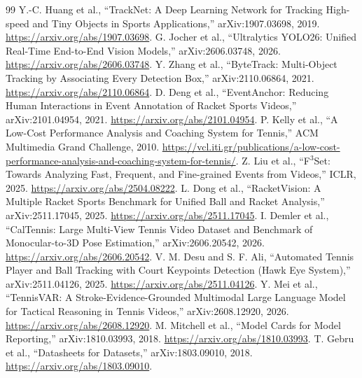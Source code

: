 \documentclass[10pt]{article}
\begin{document}
\begin{thebibliography}{99}
 Y.-C. Huang et al., ``TrackNet: A Deep Learning Network for Tracking High-speed and Tiny Objects in Sports Applications,'' arXiv:1907.03698, 2019. \url{https://arxiv.org/abs/1907.03698}.
 G. Jocher et al., ``Ultralytics YOLO26: Unified Real-Time End-to-End Vision Models,'' arXiv:2606.03748, 2026. \url{https://arxiv.org/abs/2606.03748}.
 Y. Zhang et al., ``ByteTrack: Multi-Object Tracking by Associating Every Detection Box,'' arXiv:2110.06864, 2021. \url{https://arxiv.org/abs/2110.06864}.
 D. Deng et al., ``EventAnchor: Reducing Human Interactions in Event Annotation of Racket Sports Videos,'' arXiv:2101.04954, 2021. \url{https://arxiv.org/abs/2101.04954}.
 P. Kelly et al., ``A Low-Cost Performance Analysis and Coaching System for Tennis,'' ACM Multimedia Grand Challenge, 2010. \url{https://vcl.iti.gr/publications/a-low-cost-performance-analysis-and-coaching-system-for-tennis/}.
 Z. Liu et al., ``F$^3$Set: Towards Analyzing Fast, Frequent, and Fine-grained Events from Videos,'' ICLR, 2025. \url{https://arxiv.org/abs/2504.08222}.
 L. Dong et al., ``RacketVision: A Multiple Racket Sports Benchmark for Unified Ball and Racket Analysis,'' arXiv:2511.17045, 2025. \url{https://arxiv.org/abs/2511.17045}.
 I. Demler et al., ``CalTennis: Large Multi-View Tennis Video Dataset and Benchmark of Monocular-to-3D Pose Estimation,'' arXiv:2606.20542, 2026. \url{https://arxiv.org/abs/2606.20542}.
 V. M. Desu and S. F. Ali, ``Automated Tennis Player and Ball Tracking with Court Keypoints Detection (Hawk Eye System),'' arXiv:2511.04126, 2025. \url{https://arxiv.org/abs/2511.04126}.
 Y. Mei et al., ``TennisVAR: A Stroke-Evidence-Grounded Multimodal Large Language Model for Tactical Reasoning in Tennis Videos,'' arXiv:2608.12920, 2026. \url{https://arxiv.org/abs/2608.12920}.
 M. Mitchell et al., ``Model Cards for Model Reporting,'' arXiv:1810.03993, 2018. \url{https://arxiv.org/abs/1810.03993}.
 T. Gebru et al., ``Datasheets for Datasets,'' arXiv:1803.09010, 2018. \url{https://arxiv.org/abs/1803.09010}.
\end{thebibliography}
\end{document}

